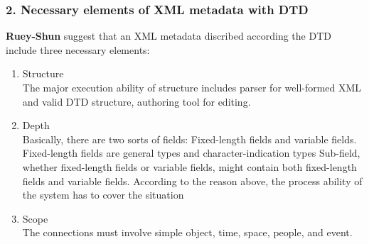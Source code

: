 \subsubsection*{2. Necessary elements of XML metadata with DTD}
\label{sec:mets}
{\bf Ruey-Shun}\cite{chen2003developing} suggest that an XML metadata discribed according the DTD include three necessary elements:
\begin{enumerate}
	\item Structure\\
	The major execution ability of structure includes parser for well-formed XML and
	valid DTD structure, authoring tool for editing.
	
	\item Depth\\
	Basically, there are two sorts of fields: Fixed-length fields and variable fields.
	Fixed-length fields are general types and character-indication types Sub-field, whether
	fixed-length fields or variable fields, might contain both fixed-length fields and
	variable fields. According to the reason above, the process ability of the system has to
	cover the situation
	
	\item Scope\\
	The connections must involve simple object, time, space, people, and event. 
\end{enumerate}


\clearpage %





